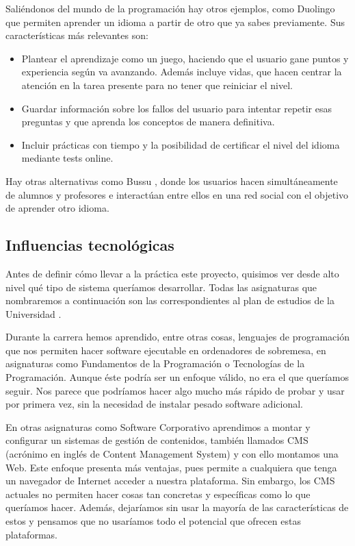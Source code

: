 Saliéndonos del mundo de la programación hay otros ejemplos, como Duolingo \cite{duolingo} que permiten aprender un idioma a partir de otro que ya sabes previamente. Sus características más relevantes son:

\begin{itemize}
\item
Plantear el aprendizaje como un juego, haciendo que el usuario gane puntos y experiencia según va avanzando. Además incluye vidas, que hacen centrar la atención en la tarea presente para no tener que reiniciar el nivel.

\item
Guardar información sobre los fallos del usuario para intentar repetir esas preguntas y que aprenda los conceptos de manera definitiva.

\item
Incluir prácticas con tiempo y la posibilidad de certificar el nivel del idioma mediante tests online.
\end{itemize}

Hay otras alternativas como Bussu \cite{bussu}, donde los usuarios hacen simultáneamente de alumnos y profesores e interactúan entre ellos en una red social con el objetivo de aprender otro idioma.

\subsection{Influencias tecnológicas\label{subsec:influencias}}

Antes de definir cómo llevar a la práctica este proyecto, quisimos ver desde alto nivel qué tipo de sistema queríamos desarrollar. Todas las asignaturas que nombraremos a continuación son las correspondientes al plan de estudios de la Universidad \cite{plan, boe}.

Durante la carrera hemos aprendido, entre otras cosas, lenguajes de programación que nos permiten hacer software ejecutable en ordenadores de sobremesa, en asignaturas como Fundamentos de la Programación o Tecnologías de la Programación. Aunque éste podría ser un enfoque válido, no era el que queríamos seguir. Nos parece que podríamos hacer algo mucho más rápido de probar y usar por primera vez, sin la necesidad de instalar pesado software adicional.

En otras asignaturas como Software Corporativo aprendimos a montar y configurar un sistemas de gestión de contenidos, también llamados CMS (acrónimo en inglés de Content Management System) y con ello montamos una Web. Este enfoque presenta más ventajas, pues permite a cualquiera que tenga un navegador de Internet acceder a nuestra plataforma. Sin embargo, los CMS actuales no permiten hacer cosas tan concretas y específicas como lo que queríamos hacer. Además, dejaríamos sin usar la mayoría de las características de estos y pensamos que no usaríamos todo el potencial que ofrecen estas plataformas.

